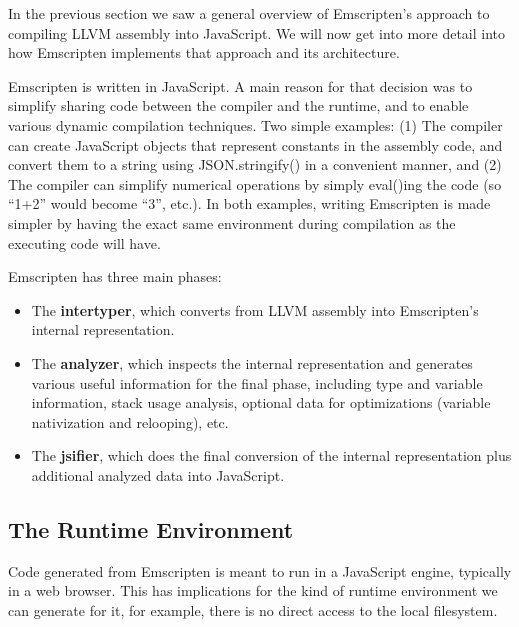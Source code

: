 \documentclass[11pt]{proc}
\begin{document}
In the previous section we saw a general overview of Emscripten's approach
to compiling LLVM assembly into JavaScript. We will now get into more detail
into how Emscripten implements that approach and its architecture.

Emscripten is written in JavaScript. A main reason for that decision
was to simplify sharing code between the compiler and the runtime, and
to enable various dynamic compilation techniques. Two simple examples: (1)
The compiler can create JavaScript objects that represent constants in
the assembly code, and convert them to a string using JSON.stringify()
in a convenient manner,
and (2) The compiler can simplify numerical operations by simply
eval()ing the code (so ``1+2'' would become ``3'', etc.). In both examples,
writing Emscripten is made simpler by having the exact same environment
during compilation as the executing code will have.

Emscripten has three main phases:
\begin{itemize}
\item The \textbf{intertyper}, which converts from LLVM assembly into
      Emscripten's internal representation.
\item The \textbf{analyzer}, which inspects the internal representation
      and generates various useful information for the final phase,
      including type and variable information, stack usage analysis,
      optional data for optimizations
      (variable nativization and relooping), etc.
\item The \textbf{jsifier}, which does the final conversion of the
      internal representation plus additional analyzed data into JavaScript.
\end{itemize}

\subsection{The Runtime Environment}

Code generated from Emscripten is meant to run in a JavaScript engine,
typically in a web browser. This has implications for the kind of
runtime environment we can generate for it, for example, there is no
direct access to the local filesystem.
\end{document}
